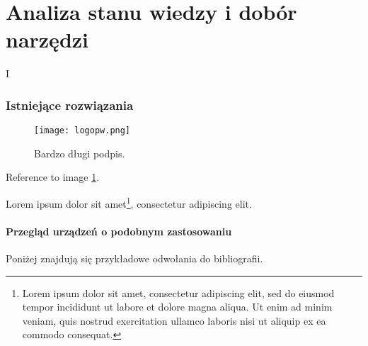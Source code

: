 \part{Analiza stanu wiedzy i dobór narzędzi}{I}

\noindent \lipsum[1-5]
\clearpage\section{Istniejące rozwiązania}
\noindent \lipsum[2]

\begin{figure}[!h]
    \centering \texttt{[image: logopw.png]}
    
    \caption{Bardzo długi podpis.\lipsum[1]}
    \label{fig:tradycyjne-logo-pw}
\end{figure}

\lipsum[2] Reference to image \ref{fig:tradycyjne-logo-pw}.

\lipsum[4] Lorem ipsum dolor sit amet\footnote{Lorem ipsum dolor sit amet, consectetur adipiscing elit, sed do eiusmod tempor incididunt ut labore et dolore magna aliqua. Ut enim ad minim veniam, quis nostrud exercitation ullamco laboris nisi ut aliquip ex ea commodo consequat.}, consectetur adipiscing elit.

\subsection{Przegląd urządzeń o podobnym zastosowaniu}

\noindent Poniżej znajdują się przykładowe odwołania do bibliografii. 


